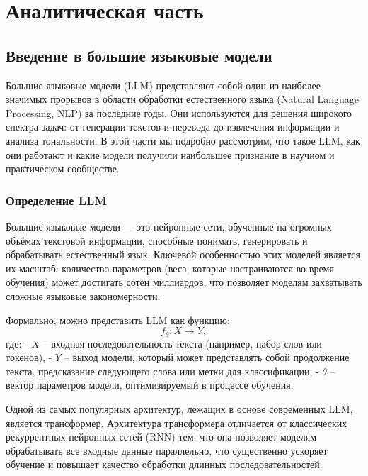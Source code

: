\chapter{Аналитическая часть}

\section{Введение в большие языковые модели}

Большие языковые модели (LLM) представляют собой один из наиболее значимых прорывов в области обработки естественного языка (Natural Language Processing, NLP) за последние годы. 
Они используются для решения широкого спектра задач: от генерации текстов и перевода до извлечения информации и анализа тональности. 
В этой части мы подробно рассмотрим, что такое LLM, как они работают и какие модели получили наибольшее признание в научном и практическом сообществе.

\subsection{Определение LLM}

Большие языковые модели — это нейронные сети, обученные на огромных объёмах текстовой информации, способные понимать, генерировать и обрабатывать естественный язык. 
Ключевой особенностью этих моделей является их масштаб: количество параметров (веса, которые настраиваются во время обучения) может достигать сотен миллиардов, 
что позволяет моделям захватывать сложные языковые закономерности.

Формально, можно представить LLM как функцию:
\[
f_\theta: X \rightarrow Y,
\]
где:
- \(X\) – входная последовательность текста (например, набор слов или токенов),
- \(Y\) – выход модели, который может представлять собой продолжение текста, предсказание следующего слова или метки для классификации,
- \(\theta\) – вектор параметров модели, оптимизируемый в процессе обучения.

Одной из самых популярных архитектур, лежащих в основе современных LLM, является трансформер. 
Архитектура трансформера отличается от классических рекуррентных нейронных сетей (RNN) тем, что она позволяет моделям обрабатывать все входные данные параллельно, 
что существенно ускоряет обучение и повышает качество обработки длинных последовательностей. 

